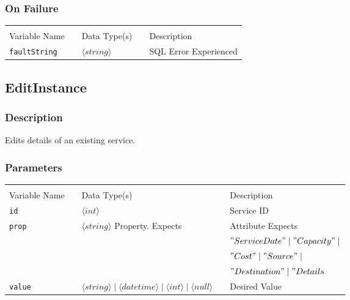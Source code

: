\subsubsection{On Failure}

\begin{tabular}{lllll}
				&	&	&	&	\\
Variable Name	&		&	Data Type(s)		&	&	Description	\\
\verb!faultString! & \hspace{15mm} & $\langle string\rangle $ & \hspace{15mm} & SQL Error Experienced \\
\end{tabular}


\subsection{EditInstance}

\subsubsection{Description}

Edits details of an existing service.

\subsubsection{Parameters}

\begin{tabular}{lllll}
				&	&	&	&	\\
Variable Name	&		&	Data Type(s)		&	&	Description	\\
\verb!id! & \hspace{15mm} & $\langle int\rangle $ & \hspace{15mm} & Service ID \\
\verb!prop! & \hspace{15mm} & $\langle string\rangle $ Property. Expects
& \hspace{15mm} & Attribute  Expects \\
	&	&	&	&	$"ServiceDate" \mid "Capacity" \mid$\\ 
	&	&	&	&	$"Cost" \mid "Source" \mid $ \\
	&	&	&	&	$"Destination" \mid"Details$ \\
\verb!value! & \hspace{15mm} & $\langle string\rangle  \mid \langle datetime\rangle  \mid \langle int\rangle  \mid
\langle null\rangle $  & \hspace{15mm} & Desired Value \\
\end{tabular}

